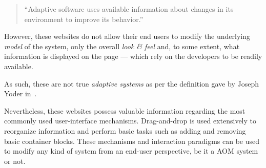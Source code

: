 \begin{quote}
  ``Adaptive software uses available information about changes in its environment to improve its behavior.''
\end{quote}

However, these websites do not allow their end users to modify the underlying \emph{model} of the system, only the overall \emph{look \& feel} and, to some extent, what information is displayed on the page --- which rely on the developers to be readily available.

As such, these are not true \emph{adaptive systems} as per the definition gave by Joseph Yoder in~\cite{YJ02}.

Nevertheless, these websites possess valuable information regarding the most commonly used user-interface mechanisms. Drag-and-drop is used extensively to reorganize information and perform basic tasks such as adding and removing basic container blocks. These mechanisms and interaction paradigms can be used to modify any kind of system from an end-user perspective, be it a AOM system or not.
